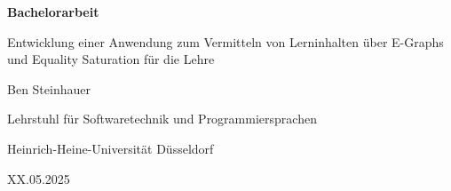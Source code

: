 \begin{frame}
    \thispagestyle{empty}
    \centering

    {\bf\color{black} Bachelorarbeit}\vspace{4mm}

    {\color{hhuUniBlau}\large Entwicklung einer Anwendung zum Vermitteln von Lerninhalten über E-Graphs und Equality Saturation für die Lehre}\vspace{4mm}

    {\color{hhuUniBlau} Ben Steinhauer}\vspace{3mm}

    {\footnotesize Lehrstuhl für Softwaretechnik und Programmiersprachen}\vspace{-1mm}

    {\footnotesize Heinrich-Heine-Universität Düsseldorf}\vspace{4mm}

    {\footnotesize XX.05.2025}

\end{frame}